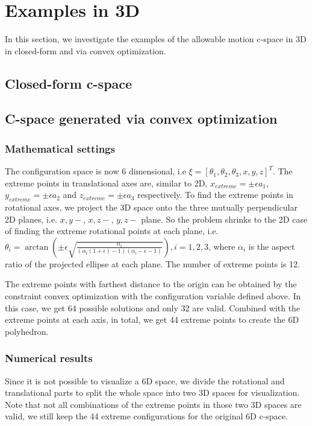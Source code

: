 \documentclass{article}
\begin{document}
\section{Examples in 3D}
In this section, we investigate the examples of the allowable motion c-space in 3D in closed-form and via convex optimization.

\subsection{Closed-form c-space}
\subsection{C-space generated via convex optimization}
\subsubsection{Mathematical settings}
The configuration space is now 6 dimensional, i.e $\xi = [\theta_1,\theta_2,\theta_3,x,y,z]^T$. The extreme points in translational axes are, similar to 2D, $x_{extreme} = \pm \epsilon a_1$, $y_{extreme} = \pm \epsilon a_2$ and $z_{extreme} = \pm \epsilon a_3$ respectively. To find the extreme points in rotational axes, we project the 3D space onto the three mutually perpendicular 2D planes, i.e. $x,y-$, $x,z-$, $y,z-$ plane. So the problem shrinks to the 2D case of finding the extreme rotational points at each plane, i.e. $\theta_i = \arctan(\pm \epsilon \sqrt{\frac{\alpha_i}{(\alpha_i(1+\epsilon)-1) (\alpha_i - \epsilon - 1)}}), i = 1,2,3$, where $\alpha_i$ is the aspect ratio of the projected ellipse at each plane. The number of extreme points is 12.

The extreme points with farthest distance to the origin can be obtained by the constraint convex optimization with the configuration variable defined above. In this case, we get 64 possible solutions and only 32 are valid. Combined with the extreme points at each axis, in total, we get 44 extreme points to create the 6D polyhedron.

\subsubsection{Numerical results}
Since it is not possible to visualize a 6D space, we divide the rotational and translational parts to split the whole space into two 3D spaces for visualization. Note that not all combinations of the extreme points in those two 3D spaces are valid, we still keep the 44 extreme configurations for the original 6D c-space. 
\end{document}
